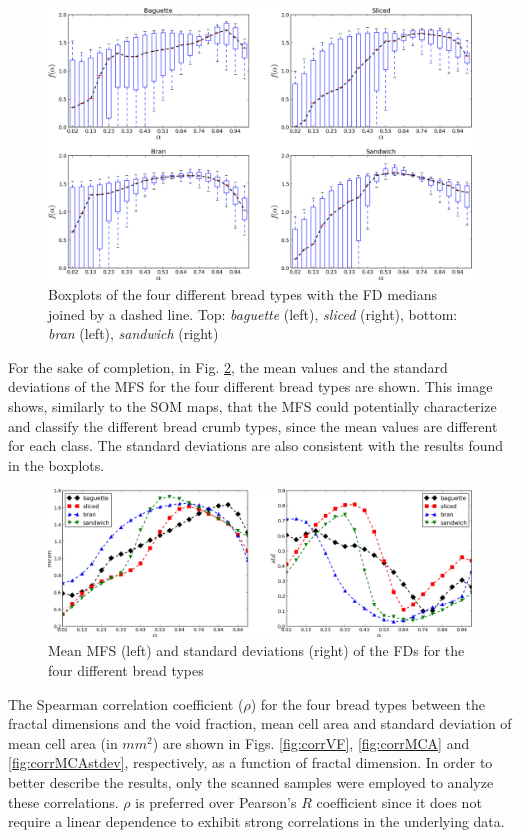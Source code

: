 \begin{figure}
\centering
\includegraphics[scale=0.48]{../images/Fig5}
\caption{Boxplots of the four different bread types with the FD medians joined by a dashed line. Top: {\em baguette} (left), {\em sliced} (right), bottom: {\em bran} (left), {\em sandwich} (right)}
\label{fig:boxplotsMFS}
\end{figure}


For the sake of completion, in Fig. \ref{fig:meansMFS}, the mean values and the standard deviations of the MFS for the four different bread types are shown. This image shows, similarly to the SOM maps, that the MFS could potentially characterize and classify the different bread crumb types, since the mean values are different for each class. The standard deviations are also consistent with the results found in the boxplots. 

\begin{figure}
\centering
\includegraphics[scale=0.45]{../images/Fig6}
\caption{Mean MFS (left) and standard deviations (right) of the FDs for the four different bread types}
\label{fig:meansMFS}
\end{figure}

The Spearman correlation coefficient ($\rho$) for the four bread types between the fractal dimensions and the void fraction, mean cell area and standard deviation of mean cell area (in $mm^{2}$) are shown in Figs. \ref{fig:corrVF}, \ref{fig:corrMCA} and \ref{fig:corrMCAstdev}, respectively, as a function of fractal dimension. In order to better describe the results, only the scanned samples were employed to analyze these correlations. $\rho$ is preferred over Pearson's $R$ coefficient since it does not require a linear dependence to exhibit strong correlations in the underlying data.

